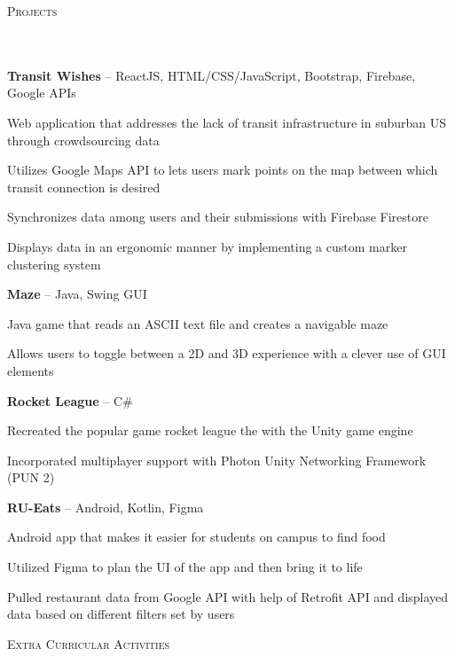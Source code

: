 \documentclass{article}
\newcommand{\header}[1]{{
\hspace*{0pt}\vspace*{6pt} \textsc{#1}} \vspace*{-6pt} 
\lineunder
}
\newcommand{\lineunder}{
\vspace*{-8pt} \\ \hspace*{-3pt} 
\hrulefill \\
}
\newcommand{\project}[3]{{
\vspace*{2pt}%
\textbf{#1} #2 \hfill #3\vspace*{2pt}}
}
\renewcommand{\labelitemii}{
$\vcenter{\hbox{\tiny$\bullet$}}$\hspace*{-3pt}
}
\newenvironment{bullet-list-minor}{
\begin{list}{\labelitemii}{\setlength\leftmargin{15pt} 
\topsep 0pt \itemsep -2pt}}{\vspace*{4pt}\end{list}
}
\begin{document}
\vspace*{4pt}%
\header{Projects}
    \project{Transit Wishes}{-- ReactJS, HTML/CSS/JavaScript, Bootstrap, Firebase, Google APIs }{}
    \begin{bullet-list-minor}
    \item Web application that addresses the lack of transit infrastructure in suburban US through crowdsourcing data
    \item Utilizes Google Maps API to lets users mark points on the map between which transit connection is desired
    \item Synchronizes data among users and their submissions with Firebase Firestore
    \item Displays data in an ergonomic manner by implementing a custom marker clustering system
    \end{bullet-list-minor}

    \project{Maze}{-- Java, Swing GUI}{}
	\begin{bullet-list-minor}
	\item Java game that reads an ASCII text file and creates a navigable maze
	\item Allows users to toggle between a 2D and 3D experience with a clever use of GUI elements
    \end{bullet-list-minor}

    \project{Rocket League}{-- C\#}{ }
	\begin{bullet-list-minor}
    \item Recreated the popular game rocket league the with the Unity game engine
    \item Incorporated multiplayer support with Photon Unity Networking Framework (PUN 2)
    \end{bullet-list-minor}
    
    \project{RU-Eats}{-- Android, Kotlin, Figma}{}
	\begin{bullet-list-minor}
	\item Android app that makes it easier for students on campus to find food
	\item Utilized Figma to plan the UI of the app and then bring it to life
	\item Pulled restaurant data from Google API with help of Retrofit API and displayed data based on different filters set by users
	\end{bullet-list-minor}

\vspace*{4pt}%

\header{Extra Curricular Activities}
\end{document}
